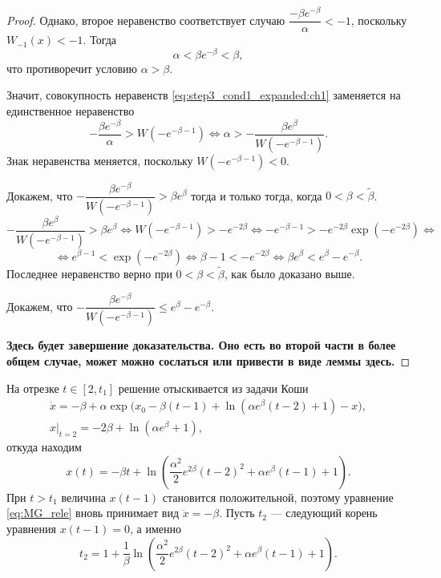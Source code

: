 \begin{proof}
Однако, второе неравенство соответствует случаю $\dfrac{-\beta e^{-\beta}}{\alpha} < -1$, поскольку $W_{-1}(x) < -1$. Тогда
\[
\alpha < \beta e^{-\beta} < \beta,
\]
что противоречит условию $\alpha > \beta$.

Значит, совокупность неравенств \eqref{eq:step3_cond1_expanded:ch1} заменяется на единственное неравенство
\[
    -\frac{\beta e^{-\beta}}{\alpha} > W(-e^{-\beta - 1}) \Leftrightarrow \alpha > -\dfrac{\beta e^{\beta}}{W(-e^{-\beta - 1})}.
\]
%
Знак неравенства меняется, поскольку $W(-e^{-\beta - 1}) < 0$.

Докажем, что $-\dfrac{\beta e^{-\beta}}{W(-e^{-\beta - 1})} > \beta e^{\beta}$ тогда и только тогда, когда $0 < \beta < \tilde{\beta}$.
%
\[
-\dfrac{\beta e^{\beta}}{W(-e^{-\beta - 1})} > \beta e^{\beta} \Leftrightarrow W(-e^{-\beta - 1}) > -e^{-2\beta} \Leftrightarrow -e^{-\beta - 1} > -e^{-2\beta} \exp(-e^{-2\beta}) \Leftrightarrow
\]
%
\[
\Leftrightarrow e^{\beta - 1} < \exp(-e^{-2\beta}) \Leftrightarrow \beta - 1 < -e^{-2\beta} \Leftrightarrow \beta e^{\beta} < e^{\beta} - e^{-\beta}.
\]
Последнее неравенство верно при $0 < \beta < \tilde{\beta}$, как было доказано выше.

Докажем, что $-\dfrac{\beta e^{-\beta}}{W(-e^{-\beta - 1})} \leqslant e^{\beta} - e^{-\beta}$.

\textbf{Здесь будет завершение доказательства. Оно есть во второй части в более общем случае, может можно сослаться или привести в виде леммы здесь.}

\end{proof}

На отрезке $t \in [2, t_1]$ решение отыскивается из задачи Коши 
%
\begin{multline}
    \dot{x} = -\beta + \alpha\exp\bigg(x_0 - \beta(t - 1) + \ln(\alpha e^{\beta}(t - 2) + 1) - x\bigg),\\
    x|_{t = 2} = - 2 \beta + \ln(\alpha e^{\beta} + 1),
\end{multline}
%
откуда находим
\begin{equation}
    x(t) = -\beta t + \ln\left(\frac{\alpha^2}{2}e^{2\beta}(t - 2)^2+\alpha e^{\beta}(t - 1) + 1\right).
\end{equation}
%
При $t > t_1$ величина $x(t - 1)$ становится положительной, поэтому уравнение \eqref{eq:MG_rele} вновь принимает вид $\dot{x} = -\beta$. Пусть $t_2$ --- следующий корень уравнения $x(t - 1) = 0$, а именно
\begin{equation}
\label{eq:t2}
t_2 = 1 + \dfrac{1}{\beta}\ln\left(\frac{\alpha^2}{2}e^{2\beta}(t - 2)^2 + \alpha e^{\beta}(t - 1) + 1\right).
\end{equation}

